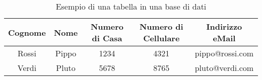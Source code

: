 \begin{table}
\begin{center}
\begin{tabular}{|c|c|c|c|c|}

\hline
Cognome	& Nome		& Numero di Casa	& Numero di Cellulare	& Indirizzo eMail \\
\hline
Rossi	& Pippo		& 1234			& 4321				&pippo@rossi.com\\
\hline
Verdi	& Pluto		& 5678			& 8765				&pluto@verdi.com\\
\hline
\end{tabular}

\caption{Esempio di una tabella in una base di dati}
\label{rubrica}

\end{center}
\end{table}